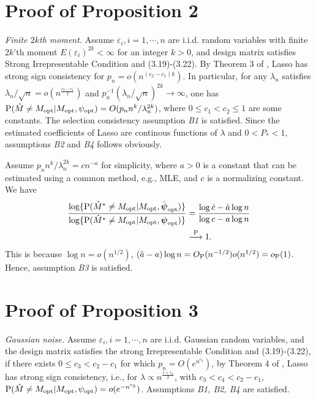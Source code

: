 \documentclass[10pt]{book}
\theoremstyle{definition}
\renewcommand{\vec}[1]{\boldsymbol{#1}}
\begin{document}
\section{Proof of Proposition 2} {\it Finite $2k$th moment.}
Assume $\varepsilon_i, i=1,\cdots, n$ are i.i.d. random variables with finite $2k$'th moment $E(\varepsilon_i)^{2k}<\infty$ for an integer $k>0$, and design matrix satisfies Strong Irrepresentable Condition and (3.19)-(3.22). By Theorem 3 of \citet{zhao}, Lasso has strong sign consistency for $p_n=o(n^{(c_2-c_1)k})$. In particular, for any $\lambda_n$ satisfies $\lambda_n/\sqrt{n} =o( n^{\frac{c_2-c_1}{2}})$ and $p_n^{-1}(\lambda_n/\sqrt{n})^{2k}\rightarrow \infty$, one has ${\rm P}(\hat{M}\neq M_{\rm opt}|M_{\rm opt},\psi_{\rm opt}) = O(p_n n^k/\lambda_n^{2k})$, where $0\leq c_1<c_2
 \leq 1$ are some constants. The selection consistency assumption {\it B1} is satisfied. Since the estimated coefficients of Lasso are continous functions of $\lambda$ and $0<P_* <1$, assumptions {\it B2} and {\it B4} follows obviously.
 
Assume $p_n n^k/\lambda_n^{2k}=cn^{-a}$ for simplicity, where $a>0$ is a constant that can be estimated using a common method, e.g., MLE, and $c$ is a normalizing constant. We have
\begin{align}
     \frac{\log\{{\rm P}(\hat{M}^*\neq M_{\rm opt}|M_{\rm opt},\hat{\vec{\psi}}_{\rm opt})\}}{\log\{{\rm
 P}(\hat{M}^*\neq M_{\rm opt}|M_{\rm opt},\vec{\psi}_{\rm opt})\}}
 &=\frac{\log \hat{c}-\hat{a} \log n}{\log c- a \log n}\\
 &\stackrel{\rm P}{\longrightarrow} 1. 
\end{align}
This is because $\log n =o(n^{1/2})$, $(\hat{a}- a)\log n= O_{\rm P}(n^{-1/2})o(n^{1/2})= o_{\rm P}(1)$. Hence, assumption {\it B3} is satisfied.

\section{ Proof of Proposition 3} {\it Gaussian noise.}
Assume $\varepsilon_i, i=1,\cdots, n$ are i.i.d. Gaussian random variables, and the design matrix satisfies the strong Irrepresentable Condition and (3.19)-(3.22), if there exists $0 \leq c_3 <c_2-c_1$ for which $p_n=O(e^{n^{c_3}})$, by Theorem 4 of \citet{zhao}, Lasso has strong sign consistency, i.e., for $\lambda \propto n^{\frac{1+c_4}{2}}$, with $c_3<c_4<c_2-c_1$, ${\rm P}(\hat{M}\neq M_{\rm opt}|M_{\rm opt},\psi_{\rm opt}) = o(e^{-n^{c_3}})$. Assumptions {\it B1, B2, B4} are satisfied.
 
\end{document}
